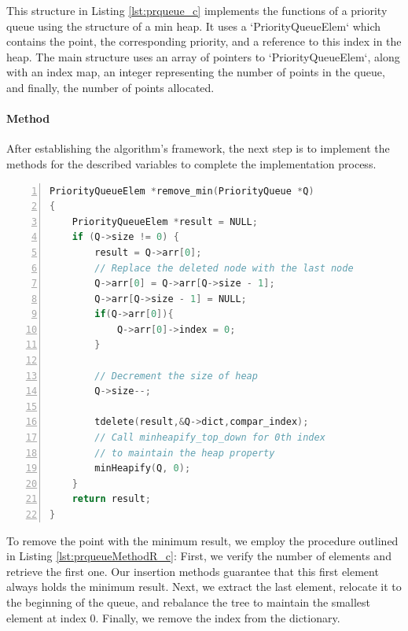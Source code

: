 This structure in Listing \ref{lst:prqueue_c} implements the functions of a priority queue using the structure of a min heap. It uses a `PriorityQueueElem` which contains the point, the corresponding priority, and a reference to this index in the heap. The main structure uses an array of pointers to `PriorityQueueElem`, along with an index map, an integer representing the number of points in the queue, and finally, the number of points allocated.


\paragraph{Method}

After establishing the algorithm's framework, the next step is to implement the methods for the described variables to complete the implementation process.

\begin{lstlisting}[float=ht,language=C, % Spécifie le langage du code
	caption={C code implementation of the PriorityQueue's Remove Min function.}, % Légende du listing
	label=lst:prqueueMethodR_c, % Étiquette pour référencer le listing
	numbers=left,
	numberstyle=\tiny\color{gray},
	stepnumber=1,
	frame=single,
	breaklines=true,
	postbreak=\mbox{\textcolor{red}{$\hookrightarrow$}\space},
	showstringspaces=false
]	
PriorityQueueElem *remove_min(PriorityQueue *Q)
{
	PriorityQueueElem *result = NULL;
	if (Q->size != 0) {
		result = Q->arr[0];
		// Replace the deleted node with the last node
		Q->arr[0] = Q->arr[Q->size - 1];
		Q->arr[Q->size - 1] = NULL;
		if(Q->arr[0]){
			Q->arr[0]->index = 0;
		}
		
		// Decrement the size of heap
		Q->size--;
		
		tdelete(result,&Q->dict,compar_index);
		// Call minheapify_top_down for 0th index
		// to maintain the heap property
		minHeapify(Q, 0);
	}
	return result;
}
\end{lstlisting}


To remove the point with the minimum result, we employ the procedure outlined in Listing \ref{lst:prqueueMethodR_c}: First, we verify the number of elements and retrieve the first one. Our insertion methods guarantee that this first element always holds the minimum result. Next, we extract the last element, relocate it to the beginning of the queue, and rebalance the tree to maintain the smallest element at index 0. Finally, we remove the index from the dictionary.

